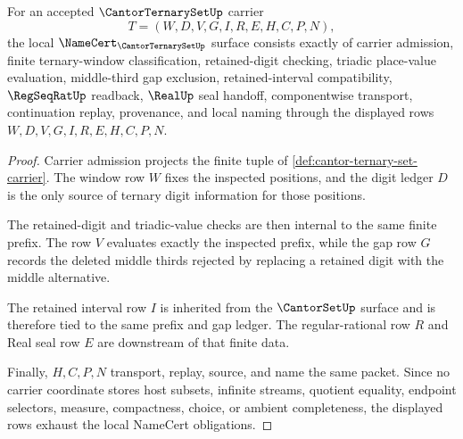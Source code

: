 \begin{theorem}
\label{thm:cantor-ternary-set-namecert-obligations}
For an accepted $\CantorTernarySetUp$ carrier
$$
T=(W,D,V,G,I,R,E,H,C,P,N),
$$
the local $\NameCert_{\CantorTernarySetUp}$ surface consists exactly of carrier admission, finite ternary-window classification, retained-digit checking, triadic place-value evaluation, middle-third gap exclusion, retained-interval compatibility, $\RegSeqRatUp$ readback, $\RealUp$ seal handoff, componentwise transport, continuation replay, provenance, and local naming through the displayed rows $W,D,V,G,I,R,E,H,C,P,N$.
\end{theorem}
\begin{proof}
Carrier admission projects the finite tuple of \autoref{def:cantor-ternary-set-carrier}. The window row $W$ fixes the inspected positions, and the digit ledger $D$ is the only source of ternary digit information for those positions.

The retained-digit and triadic-value checks are then internal to the same finite prefix. The row $V$ evaluates exactly the inspected prefix, while the gap row $G$ records the deleted middle thirds rejected by replacing a retained digit with the middle alternative.

The retained interval row $I$ is inherited from the $\CantorSetUp$ surface and is therefore tied to the same prefix and gap ledger. The regular-rational row $R$ and Real seal row $E$ are downstream of that finite data.

Finally, $H,C,P,N$ transport, replay, source, and name the same packet. Since no carrier coordinate stores host subsets, infinite streams, quotient equality, endpoint selectors, measure, compactness, choice, or ambient completeness, the displayed rows exhaust the local NameCert obligations.
\end{proof}

